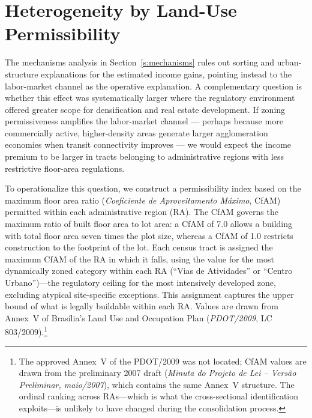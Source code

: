 \section{Heterogeneity by Land-Use Permissibility}
\label{s:appendix_cfam}

The mechanisms analysis in Section~\ref{s:mechanisms} rules out sorting and urban-structure explanations for the estimated income gains, pointing instead to the labor-market channel as the operative explanation. A complementary question is whether this effect was systematically larger where the regulatory environment offered greater scope for densification and real estate development. If zoning permissiveness amplifies the labor-market channel --- perhaps because more commercially active, higher-density areas generate larger agglomeration economies when transit connectivity improves --- we would expect the income premium to be larger in tracts belonging to administrative regions with less restrictive floor-area regulations.

To operationalize this question, we construct a permissibility index based on the maximum floor area ratio (\emph{Coeficiente de Aproveitamento Máximo}, CfAM) permitted within each administrative region (RA). The CfAM governs the maximum ratio of built floor area to lot area: a CfAM of 7.0 allows a building with total floor area seven times the plot size, whereas a CfAM of 1.0 restricts construction to the footprint of the lot. Each census tract is assigned the maximum CfAM of the RA in which it falls, using the value for the most dynamically zoned category within each RA (``Vias de Atividades'' or ``Centro Urbano'')---the regulatory ceiling for the most intensively developed zone, excluding atypical site-specific exceptions. This assignment captures the upper bound of what is legally buildable within each RA. Values are drawn from Annex~V of Brasília's Land Use and Occupation Plan (\emph{PDOT/2009}, LC 803/2009).\footnote{The approved Annex~V of the PDOT/2009 was not located; CfAM values are drawn from the preliminary 2007 draft (\emph{Minuta do Projeto de Lei -- Versão Preliminar, maio/2007}), which contains the same Annex~V structure. The ordinal ranking across RAs---which is what the cross-sectional identification exploits---is unlikely to have changed during the consolidation process.}

